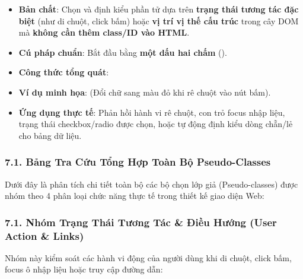 \begin{conceptBox}
\begin{itemize}[leftmargin=1.5em, itemsep=4pt, parsep=0pt]
    \item \textbf{Bản chất}: Chọn và định kiểu phần tử dựa trên \textbf{trạng thái tương tác đặc biệt} (như di chuột, click bấm) hoặc \textbf{vị trí vị thế cấu trúc} trong cây DOM mà \textbf{không cần thêm class/ID vào HTML}.
    \item \textbf{Cú pháp chuẩn}: Bắt đầu bằng \textbf{một dấu hai chấm} (\codeinline{:}).
    \item \textbf{Công thức tổng quát}:
    \par\vspace{3pt}
    \par\vspace{3pt}
    \item \textbf{Ví dụ minh họa}:  (Đổi chữ sang màu đỏ khi rê chuột vào nút bấm).
    \item \textbf{Ứng dụng thực tế}: Phản hồi hành vi rê chuột, con trỏ focus nhập liệu, trạng thái checkbox/radio được chọn, hoặc tự động định kiểu dòng chẵn/lẻ cho bảng dữ liệu.
\end{itemize}
\end{conceptBox}

\subsubsection{7.1. Bảng Tra Cứu Tổng Hợp Toàn Bộ Pseudo-Classes}

Dưới đây là phân tích chi tiết toàn bộ các bộ chọn lớp giả (Pseudo-classes) được nhóm theo 4 phân loại chức năng thực tế trong thiết kế giao diện Web:

\subsubsection{7.1. Nhóm Trạng Thái Tương Tác \& Điều Hướng (User Action \& Links)}

Nhóm này kiểm soát các hành vi động của người dùng khi di chuột, click bấm, focus ô nhập liệu hoặc truy cập đường dẫn:

